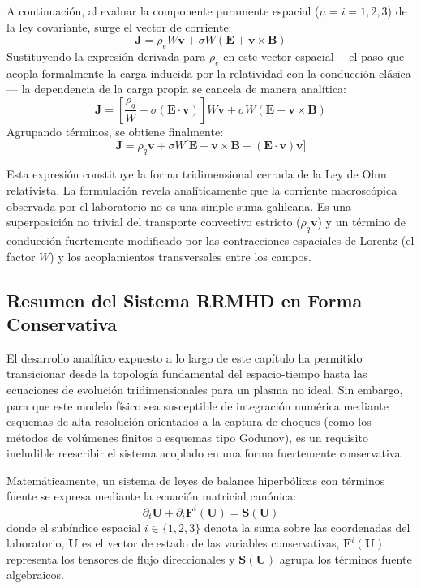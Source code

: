 A continuación, al evaluar la componente puramente espacial ($\mu = i = 1,2,3$) de la ley covariante, surge el vector de corriente:
\begin{equation}
    \mathbf{J} = \rho_e W \mathbf{v} + \sigma W (\mathbf{E} + \mathbf{v} \times \mathbf{B})
\end{equation}
Sustituyendo la expresión derivada para $\rho_e$ en este vector espacial —el paso que acopla formalmente la carga inducida por la relatividad con la conducción clásica— la dependencia de la carga propia se cancela de manera analítica:
\begin{equation}
    \mathbf{J} = \left[ \frac{\rho_q}{W} - \sigma (\mathbf{E} \cdot \mathbf{v}) \right] W \mathbf{v} + \sigma W (\mathbf{E} + \mathbf{v} \times \mathbf{B})
\end{equation}
Agrupando términos, se obtiene finalmente:
\begin{equation}
    \mathbf{J} = \rho_q \mathbf{v} + \sigma W \Big[ \mathbf{E} + \mathbf{v} \times \mathbf{B} - (\mathbf{E} \cdot \mathbf{v})\mathbf{v} \Big]
\end{equation}

Esta expresión constituye la forma tridimensional cerrada de la Ley de Ohm relativista. La formulación revela analíticamente que la corriente macroscópica observada por el laboratorio no es una simple suma galileana. Es una superposición no trivial del transporte convectivo estricto ($\rho_q \mathbf{v}$) y un término de conducción fuertemente modificado por las contracciones espaciales de Lorentz (el factor $W$) y los acoplamientos transversales entre los campos. 

\subsection{Resumen del Sistema RRMHD en Forma Conservativa}
\label{sec:RRMHD_Conservativa}

\primerparrafo El desarrollo analítico expuesto a lo largo de este capítulo ha permitido transicionar desde la topología fundamental del espacio-tiempo hasta las ecuaciones de evolución tridimensionales para un plasma no ideal. Sin embargo, para que este modelo físico sea susceptible de integración numérica mediante esquemas de alta resolución orientados a la captura de choques (como los métodos de volúmenes finitos o esquemas tipo Godunov), es un requisito ineludible reescribir el sistema acoplado en una forma fuertemente conservativa.

Matemáticamente, un sistema de leyes de balance hiperbólicas con términos fuente se expresa mediante la ecuación matricial canónica:
\begin{equation}
\label{eq:Sistema_Conservativo_General}
    \partial_t \mathbf{U} + \partial_i \mathbf{F}^i(\mathbf{U}) = \mathbf{S}(\mathbf{U})
\end{equation}
donde el subíndice espacial $i \in \{1, 2, 3\}$ denota la suma sobre las coordenadas del laboratorio, $\mathbf{U}$ es el vector de estado de las variables conservativas, $\mathbf{F}^i(\mathbf{U})$ representa los tensores de flujo direccionales y $\mathbf{S}(\mathbf{U})$ agrupa los términos fuente algebraicos. 

